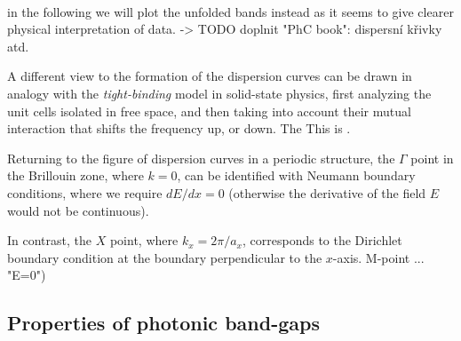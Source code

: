 \paragraph{}%

in the following we will plot the unfolded bands instead as it seems to give clearer physical interpretation of data.
-> TODO doplnit "PhC book": dispersní křivky atd.

A different view to the formation of the dispersion curves can be drawn in analogy with the \textit{tight-binding} model in solid-state physics, first analyzing the unit cells isolated in free space, and then taking into account their mutual interaction that shifts the frequency up, or down. \label{hopping}
The 
This is . %

Returning to the figure of dispersion curves in a periodic structure, %
the $\Gamma$ point in the Brillouin zone, where $k = 0$, can be identified with Neumann boundary conditions, where we require $dE/dx = 0$ (otherwise the derivative of the field $E$ would not be continuous). %

In contrast, the $X$ point, where $k_x = 2\pi/a_x$, corresponds to the Dirichlet boundary condition at the boundary perpendicular to the $x$-axis.
M-point ... "E=0")



\paragraph{}%

\paragraph{}%

\paragraph{}%

\paragraph{}%



\subsection{Properties of photonic band-gaps}


